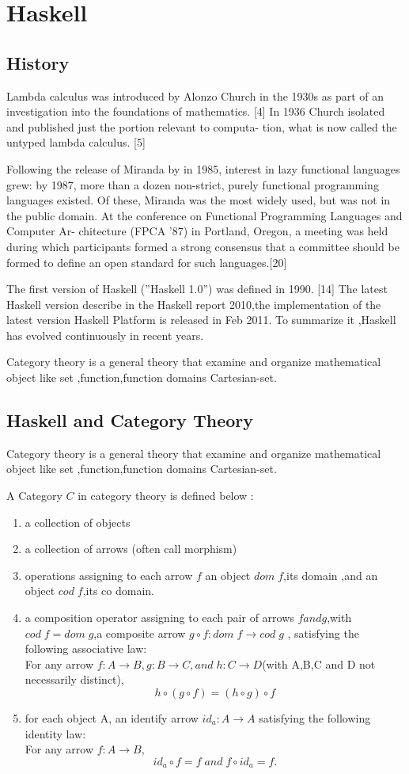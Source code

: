 \chapter{Haskell}
\section{History}
Lambda calculus was introduced by Alonzo Church in the 1930s as part of
an investigation into the foundations of mathematics. [4]
In 1936 Church isolated and published just the portion relevant to computa-
tion, what is now called the untyped lambda calculus. [5]


Following the release of Miranda by in 1985, interest in lazy functional
languages grew: by 1987, more than a dozen non-strict, purely functional
programming languages existed. Of these, Miranda was the most widely
used, but was not in the public domain.
At the conference on Functional Programming Languages and Computer Ar-
chitecture (FPCA ’87) in Portland, Oregon, a meeting was held during which
participants formed a strong consensus that a committee should be formed
to define an open standard for such languages.[20]


The first version of Haskell (”Haskell 1.0”) was defined in 1990. [14] The
latest Haskell version describe in the Haskell report 2010,the implementation
of the latest version Haskell Platform is released in Feb 2011.
To summarize it ,Haskell has evolved continuously in recent years.

Category theory is a general theory that examine and organize mathematical
object like set ,function,function domains Cartesian-set.


\section{Haskell and Category Theory}
Category theory is a general theory that examine and organize mathematical object like set ,function,function domains Cartesian-set.

A Category $C $ in category theory is defined below :
\begin{enumerate}
\item a collection of objects 
\item a collection of arrows (often call morphism) 
\item operations assigning to each arrow $f$ an object $dom\;f$,its domain ,and an object $cod\;f$,its co domain.
\item a composition operator assigning to each pair of arrows $f and g$,with $cod\;f = dom\;g$,a composite arrow $ g \circ f:dom\;f \rightarrow  cod\;g$ , satisfying the following associative law: \\
For any arrow $f: A \rightarrow B,g:B \rightarrow C,and\;h: C\rightarrow D$(with A,B,C and D not necessarily distinct),
$$h\circ (g\circ f) = (h\circ g)\circ f$$
\item for each object A, an identify arrow $id_{a}: A \rightarrow A$ satisfying the following identity law:\\
For any arrow $ f: A \rightarrow B,$ 
$$ id_{a} \circ f = f  \;and\;  f\circ id_{a} = f. $$
\end{enumerate}\cite{pierce_basic_1991}

